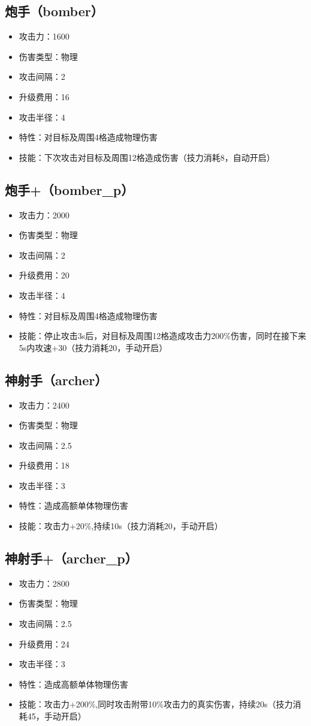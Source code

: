		\subsection{炮手（bomber）}
			\begin{itemize}
				\item 攻击力：1600
				\item 伤害类型：物理
				\item 攻击间隔：2
				\item 升级费用：16
				\item 攻击半径：4
				\item 特性：对目标及周围4格造成物理伤害
				\item 技能：下次攻击对目标及周围12格造成伤害（技力消耗8，自动开启）
			\end{itemize}
		\subsection{炮手+（bomber\_p）}
			\begin{itemize}
				\item 攻击力：2000
				\item 伤害类型：物理
				\item 攻击间隔：2
				\item 升级费用：20
				\item 攻击半径：4
				\item 特性：对目标及周围4格造成物理伤害
				\item 技能：停止攻击3s后，对目标及周围12格造成攻击力200\%伤害，同时在接下来5s内攻速+30（技力消耗20，手动开启）
			\end{itemize}
		\subsection{神射手（archer）}
			\begin{itemize}
				\item 攻击力：2400
				\item 伤害类型：物理
				\item 攻击间隔：2.5
				\item 升级费用：18
				\item 攻击半径：3
				\item 特性：造成高额单体物理伤害
				\item 技能：攻击力+20\%,持续10s（技力消耗20，手动开启）
			\end{itemize}
		\subsection{神射手+（archer\_p）}
			\begin{itemize}
				\item 攻击力：2800
				\item 伤害类型：物理
				\item 攻击间隔：2.5
				\item 升级费用：24
				\item 攻击半径：3
				\item 特性：造成高额单体物理伤害
				\item 技能：攻击力+200\%,同时攻击附带10\%攻击力的真实伤害，持续20s（技力消耗45，手动开启）
			\end{itemize}
